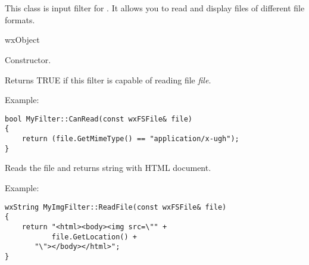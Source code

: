 %
%

\section{}\label{wxhtmlfilter}

This class is input filter for .
It allows you to read and display files of different file formats.


wxObject




\label{wxhtmlfilterwxhtmlfilter}


Constructor.

\label{wxhtmlfiltercanread}


Returns TRUE if this filter is capable of reading file {\it file}.

Example:

\begin{verbatim}
bool MyFilter::CanRead(const wxFSFile& file)
{
    return (file.GetMimeType() == "application/x-ugh");
}
\end{verbatim}

\label{wxhtmlfilterreadfile}


Reads the file and returns string with HTML document.

Example:

\begin{verbatim}
wxString MyImgFilter::ReadFile(const wxFSFile& file)
{
    return "<html><body><img src=\"" +
           file.GetLocation() +
	   "\"></body></html>";
}
\end{verbatim}

